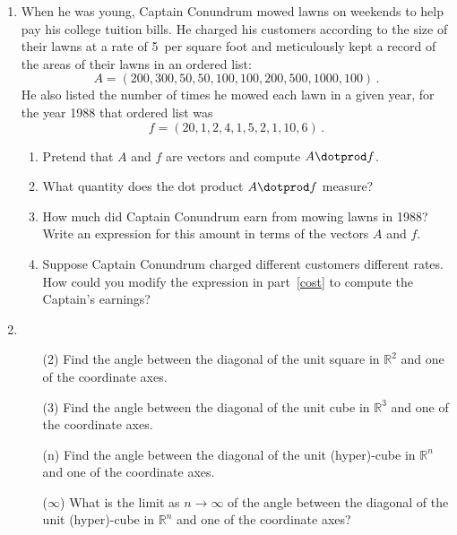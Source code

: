 

\begin{enumerate}

\item When he was young, Captain Conundrum mowed lawns on weekends to help pay his college tuition bills. He charged his customers according to the size of their lawns at a rate of 5\textcent \ per square foot and meticulously kept a record of the areas of their lawns in an ordered list:
$$
A=(200,300,50,50,100,100,200,500,1000,100)\, .
$$
He also listed the number of times he mowed each lawn in a given year, for the year 1988 that ordered list was
$$
f=(20,1,2,4,1,5,2,1,10,6)\, .
$$
\begin{enumerate}
\item
Pretend that $A$ and $f$ are vectors and compute $A\dotprod f$.
\item
What quantity does the dot product $A\dotprod f$ measure?
\item\label{cost}
How much did Captain Conundrum earn from mowing lawns in 1988? Write an expression
for this amount in terms of the vectors $A$ and $f$.
\item Suppose Captain Conundrum charged different customers different rates. How could
you modify the expression in part~\ref{cost} to compute the Captain's earnings?
\end{enumerate}


\item \begin{itemize}
	\item[(2)] Find the angle between the diagonal of the unit square in $\mathbb{R}^2$ and one of the coordinate axes.

	\item[(3)] Find the angle between the diagonal of the unit cube in $\mathbb{R}^3$ and one of the coordinate axes.

	\item[(n)] Find the angle between the diagonal of the unit (hyper)-cube in $\mathbb{R}^n$ and one of the coordinate axes.

	\item[($\infty$)] What is the limit as $n \to \infty$ of the angle between the diagonal of the unit (hyper)-cube in $\mathbb{R}^n$ and one of the coordinate axes?
\end{itemize}



\end{enumerate}
